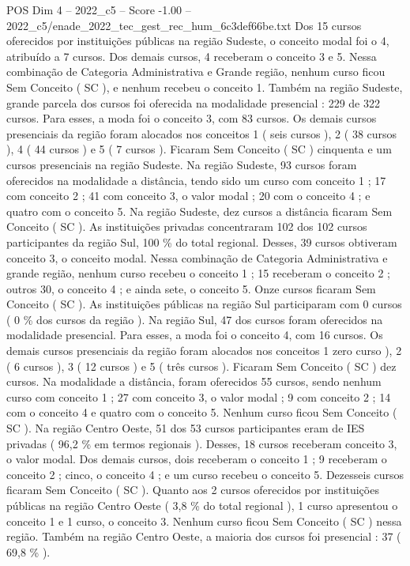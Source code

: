 \begin{textsample}{POS Dim 4 – 2022\_c5 – Score -1.00 – 2022\_c5/enade\_2022\_tec\_gest\_rec\_hum\_6c3def66be.txt}
Dos 15 cursos oferecidos por instituições públicas na região Sudeste, o conceito modal foi o 4, atribuído a 7 cursos.
Dos demais cursos, 4 receberam o conceito 3 e 5.
Nessa combinação de Categoria Administrativa e Grande região, nenhum curso ficou Sem Conceito ( SC ), e nenhum recebeu o conceito 1.
Também na região Sudeste, grande parcela dos cursos foi oferecida na modalidade presencial : 229 de 322 cursos.
Para esses, a moda foi o conceito 3, com 83 cursos.
Os demais cursos presenciais da região foram alocados nos conceitos 1 ( seis cursos ), 2 ( 38 cursos ), 4 ( 44 cursos ) e 5 ( 7 cursos ).
Ficaram Sem Conceito ( SC ) cinquenta e um cursos presenciais na região Sudeste.
Na região Sudeste, 93 cursos foram oferecidos na modalidade a distância, tendo sido um curso com conceito 1 ; 17 com conceito 2 ; 41 com conceito 3, o valor modal ; 20 com o conceito 4 ; e quatro com o conceito 5.
Na região Sudeste, dez cursos a distância ficaram Sem Conceito ( SC ).
As instituições privadas concentraram 102 dos 102 cursos participantes da região Sul, 100 \% do total regional.
Desses, 39 cursos obtiveram conceito 3, o conceito modal.
Nessa combinação de Categoria Administrativa e grande região, nenhum curso recebeu o conceito 1 ; 15 receberam o conceito 2 ; outros 30, o conceito 4 ; e ainda sete, o conceito 5.
Onze cursos ficaram Sem Conceito ( SC ).
As instituições públicas na região Sul participaram com 0 cursos ( 0 \% dos cursos da região ).
Na região Sul, 47 dos cursos foram oferecidos na modalidade presencial.
Para esses, a moda foi o conceito 4, com 16 cursos.
Os demais cursos presenciais da região foram alocados nos conceitos 1 zero curso ), 2 ( 6 cursos ), 3 ( 12 cursos ) e 5 ( três cursos ).
Ficaram Sem Conceito ( SC ) dez cursos.
Na modalidade a distância, foram oferecidos 55 cursos, sendo nenhum curso com conceito 1 ; 27 com conceito 3, o valor modal ; 9 com conceito 2 ; 14 com o conceito 4 e quatro com o conceito 5.
Nenhum curso ficou Sem Conceito ( SC ).
Na região Centro Oeste, 51 dos 53 cursos participantes eram de IES privadas ( 96,2 \% em termos regionais ).
Desses, 18 cursos receberam conceito 3, o valor modal.
Dos demais cursos, dois receberam o conceito 1 ; 9 receberam o conceito 2 ; cinco, o conceito 4 ; e um curso recebeu o conceito 5.
Dezesseis cursos ficaram Sem Conceito ( SC ).
Quanto aos 2 cursos oferecidos por instituições públicas na região Centro Oeste ( 3,8 \% do total regional ), 1 curso apresentou o conceito 1 e 1 curso, o conceito 3.
Nenhum curso ficou Sem Conceito ( SC ) nessa região.
Também na região Centro Oeste, a maioria dos cursos foi presencial : 37 ( 69,8 \% ).

\end{textsample}
